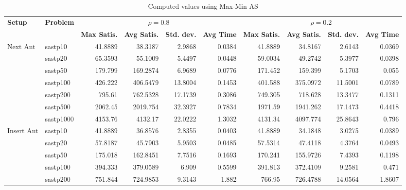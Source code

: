 \documentclass{article}
\begin{document}
\begin{table}[b!]
  \caption{Computed values using Max-Min AS}
  \vspace{1mm}
  \label{tab:conf2}
  \setlength{\tabcolsep}{1.4mm}
  \centering
  \resizebox{\textwidth}{!} {
  \begin{tabular}{p{1.6cm}|l||rrrr|rrrr}
    \multirow{2}{*}{\bfseries Setup} &
    \multirow{2}{*}{\bfseries Problem} &
      \multicolumn{4}{c}{$\rho=0.8$} &
      \multicolumn{4}{|c}{$\rho=0.2$} \\ 
    & &
    \bfseries Max Satis. &
    \bfseries Avg Satis. &
    \bfseries Std. dev. &
    \bfseries Avg Time &
    \bfseries Max Satis. &
    \bfseries Avg Satis. &
    \bfseries Std. dev. &
    \bfseries Avg Time 
    \\\hline
\multirow{7}{*}{Next Ant} 
 &  sastp10 & 41.8889 & 38.3187 & 2.9868 & 0.0384 & 
              41.8889 & 34.8167 & 2.6143 & 0.0369 \\ 
 &  sastp20 & 65.3593 & 55.1009 & 5.4497 & 0.0448 & 
              59.0034 & 49.2742 & 5.3977 & 0.0398 \\ 
 &  sastp50 & 179.799 & 169.2874 & 6.9689 & 0.0776 &
              171.452 & 159.399 & 5.1703 & 0.055 \\ 
 &  sastp100 & 426.222 & 406.5479 & 13.8004 & 0.1453 & 
               401.588 & 375.0972 & 11.5001 & 0.0789 \\ 
 &  sastp200 & 795.61 & 762.5328 & 17.1739 & 0.3086 & 
               749.305 & 718.628 & 13.3477 & 0.1311 \\ 
 &  sastp500 & 2062.45 & 2019.754 & 32.3927 & 0.7834 & 
               1971.59 & 1941.262 & 17.1473 & 0.4418 \\ 
 &  sastp1000 & 4153.76 & 4132.17 & 22.0222 & 1.3032 &
                4131.34 & 4097.774 & 25.8643 & 0.796 \\
    \hline
\multirow{7}{*}{Insert Ant} 
  & sastp10 & 41.8889 & 36.8576 & 2.8355 & 0.0403 &
              41.8889 & 34.1848 & 3.0275 & 0.0389 \\
  & sastp20 & 57.8187 & 45.7903 & 5.9503 & 0.0485 &
              57.5314 & 47.4118 & 4.3764 & 0.0493 \\
  & sastp50 & 175.018 & 162.8451 & 7.7516 & 0.1693 &
              170.241 & 155.9726 & 7.4393 & 0.1198 \\
  & sastp100 & 394.333 & 379.0589 & 6.909 & 0.5599 &
               391.813 & 372.4109 & 9.2581 & 0.471 \\
  & sastp200 & 751.844 & 724.9853 & 9.3143 & 1.882 &
               766.95 & 726.4788 & 14.0564 & 1.8607 \\

\end{tabular}}
\end{table}
\end{document}
